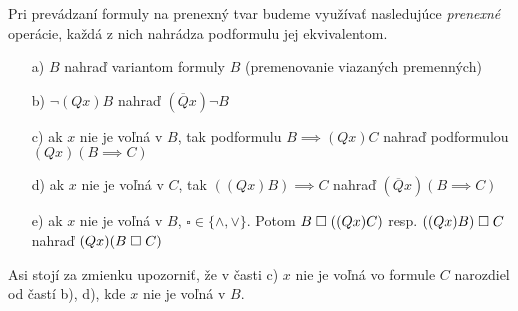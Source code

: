 Pri prevádzaní formuly na prenexný tvar budeme využívať nasledujúce
\emph{prenexné} operácie, každá z nich nahrádza podformulu
jej ekvivalentom.
\begin{itemize}
    \item[a)] $B$ nahraď variantom formuly $B$ (premenovanie viazaných
    premenných)
    \item[b)] $\neg(Q x) B$ nahraď $(\overline{Q} x) \neg B$
    \item[c)] ak $x$ nie je voľná v $B$, tak podformulu $B\implies (Qx)C$
            nahraď podformulou $(Qx) (B\implies C)$
    \item[d)] ak $x$ nie je voľná v $C$, tak $((Qx) B) \implies C$
        nahraď $(\overline{Q} x) (B \implies C)$
    \item[e)] ak $x$ nie je voľná v $B$, $\square \in \{\land,\lor\}$.
     Potom $B \;\square\; ((Qx)C)$ resp. $((Qx)B)\;\square\; C$ nahraď
     $(Qx)(B \;\square\; C)$
\end{itemize}
\begin{poznamka}
    Asi stojí za zmienku upozorniť, že v časti c) $x$ nie je voľná vo
    formule $C$ narozdiel od častí b), d), kde $x$ nie je voľná v $B$.
\end{poznamka}

